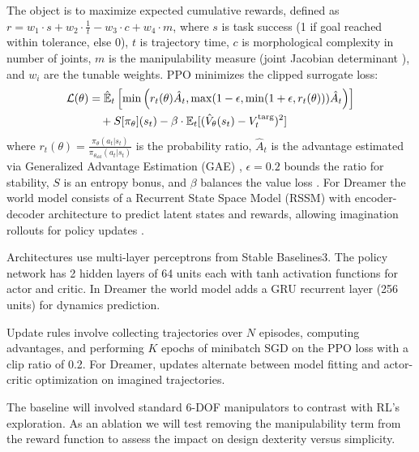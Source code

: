 \documentclass[conference]{IEEEtran}
\begin{document}
The object is to maximize expected cumulative rewards, defined as $r = w_1 \cdot s + w_2 \cdot \frac{1}{t} - w_3 \cdot c + w_4 \cdot m$, where $s$ is task success (1 if goal reached within tolerance, else 0), $t$ is trajectory time, $c$ is morphological complexity in number of joints, $m$ is the manipulability measure (joint Jacobian determinant \cite{yoshikawa1985manipulability}), and $w_i$ are the tunable weights.
PPO minimizes the clipped surrogate loss:
\begin{align}
\mathcal{L}(\theta) &= \hat{\mathbb{E}}_t \left[ \min\left(r_t(\theta) \hat{A}_t, \max(1-\epsilon, \min(1+\epsilon, r_t(\theta))) \hat{A}_t\right) \right] \notag \\
&\quad + S[\pi_\theta](s_t) - \beta \cdot \mathbb{E}_t [(\hat{V}_\theta(s_t) - V_t^{\text{targ}})^2]
\end{align}
where $r_t(\theta) = \frac{\pi_\theta(a_t|s_t)}{\pi_{\theta_{\text{old}}}(a_t|s_t)}$ is the probability ratio, $\hat{A}_t$ is the advantage estimated via Generalized Advantage Estimation (GAE) \cite{schulman2015high}, $\epsilon=0.2$ bounds the ratio for stability, $S$ is an entropy bonus, and $\beta$ balances the value loss \cite{schulman2017proximal}.
For Dreamer the world model consists of a Recurrent State Space Model (RSSM) with encoder-decoder architecture to predict latent states and rewards, allowing imagination rollouts for policy updates \cite{hafner2019dream}.

Architectures use multi-layer perceptrons from Stable Baselines3.
The policy network has 2 hidden layers of 64 units each with tanh activation functions for actor and critic.
In Dreamer the world model adds a GRU recurrent layer (256 units) for dynamics prediction.

Update rules involve collecting trajectories over $N$ episodes, computing advantages, and performing $K$ epochs of minibatch SGD on the PPO loss with a clip ratio of 0.2.
For Dreamer, updates alternate between model fitting and actor-critic optimization on imagined trajectories.

The baseline will involved standard 6-DOF manipulators to contrast with RL's exploration.
As an ablation we will test removing the manipulability term from the reward function to assess the impact on design dexterity versus simplicity.
\end{document}
